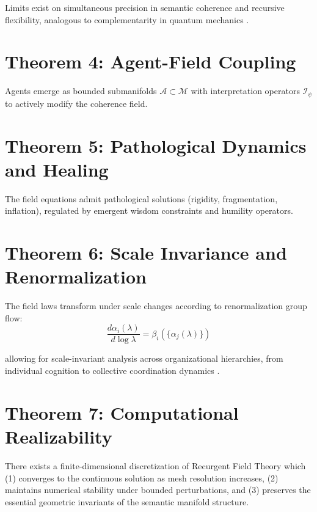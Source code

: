 Limits exist on simultaneous precision in semantic coherence and recursive flexibility, analogous to complementarity in quantum mechanics \autocite{Heisenberg1927}.

\section{Theorem 4: Agent-Field Coupling}
Agents emerge as bounded submanifolds \(\mathcal{A} \subset \mathcal{M}\) with interpretation operators \(\mathcal{I}_{\psi}\) to actively modify the coherence field.

\section{Theorem 5: Pathological Dynamics and Healing}
The field equations admit pathological solutions (rigidity, fragmentation, inflation), regulated by emergent wisdom constraints and humility operators.

\section{Theorem 6: Scale Invariance and Renormalization}
The field laws transform under scale changes according to renormalization group flow:
\begin{equation}
\frac{d\alpha_i(\lambda)}{d\log\lambda} = \beta_i(\{\alpha_j(\lambda)\})
\end{equation}

allowing for scale-invariant analysis across organizational hierarchies, from individual cognition to collective coordination dynamics \autocite{Wilson1971}.

\section{Theorem 7: Computational Realizability}
There exists a finite-dimensional discretization of Recurgent Field Theory which (1) converges to the continuous solution as mesh resolution increases, (2) maintains numerical stability under bounded perturbations, and (3) preserves the essential geometric invariants of the semantic manifold structure. 